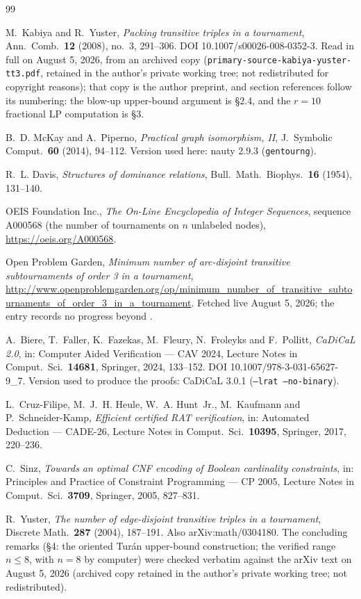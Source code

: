 \documentclass[11pt]{amsart}
\theoremstyle{plain}
\theoremstyle{definition}
\theoremstyle{remark}
\begin{document}
\begin{thebibliography}{99}

M.~Kabiya and R.~Yuster,
\emph{Packing transitive triples in a tournament},
Ann.\ Comb.\ \textbf{12} (2008), no.~3, 291--306.
DOI 10.1007/s00026-008-0352-3. Read in full on August 5, 2026, from an
archived copy (\texttt{primary-source-kabiya-yuster-tt3.pdf}, retained
in the author's private working tree; not redistributed for copyright
reasons); that copy is the author
preprint, and section references follow its numbering: the blow-up
upper-bound argument is \S2.4, and the $r=10$ fractional LP computation
is \S3.

B.~D. McKay and A.~Piperno,
\emph{Practical graph isomorphism, II},
J.\ Symbolic Comput.\ \textbf{60} (2014), 94--112. Version used here:
nauty 2.9.3 (\texttt{gentourng}).

R.~L. Davis,
\emph{Structures of dominance relations},
Bull.\ Math.\ Biophys.\ \textbf{16} (1954), 131--140.

OEIS Foundation Inc.,
\emph{The On-Line Encyclopedia of Integer Sequences}, sequence A000568
(the number of tournaments on $n$ unlabeled nodes),
\url{https://oeis.org/A000568}.

Open Problem Garden, \emph{Minimum number of arc-disjoint transitive
subtournaments of order 3 in a tournament},
\url{http://www.openproblemgarden.org/op/minimum_number_of_transitive_subtournaments_of_order_3_in_a_tournament}.
Fetched live August 5, 2026; the entry records no progress beyond
\cite{KY08}.

A.~Biere, T.~Faller, K.~Fazekas, M.~Fleury, N.~Froleyks and F.~Pollitt,
\emph{CaDiCaL 2.0},
in: Computer Aided Verification --- CAV 2024, Lecture Notes in Comput.\
Sci.\ \textbf{14681}, Springer, 2024, 133--152.
DOI 10.1007/978-3-031-65627-9\_7. Version used to produce the proofs:
CaDiCaL 3.0.1 (\texttt{--lrat --no-binary}).

L.~Cruz-Filipe, M.~J.~H. Heule, W.~A. Hunt~Jr., M.~Kaufmann and
P.~Schneider-Kamp,
\emph{Efficient certified RAT verification},
in: Automated Deduction --- CADE-26, Lecture Notes in Comput.\ Sci.\
\textbf{10395}, Springer, 2017, 220--236.

C.~Sinz,
\emph{Towards an optimal CNF encoding of Boolean cardinality
constraints},
in: Principles and Practice of Constraint Programming --- CP 2005,
Lecture Notes in Comput.\ Sci.\ \textbf{3709}, Springer, 2005, 827--831.

\bibitem[Yus04]{Yuster04}
R.~Yuster,
\emph{The number of edge-disjoint transitive triples in a tournament},
Discrete Math.\ \textbf{287} (2004), 187--191. Also
arXiv:math/0304180. The concluding remarks (\S4: the oriented Tur\'an
upper-bound construction; the verified range $n\le8$, with $n=8$ by
computer) were checked verbatim against the arXiv text on August 5,
2026 (archived copy retained in the author's private working tree; not
redistributed).

\end{thebibliography}
\end{document}
